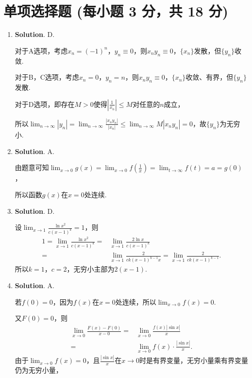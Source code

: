 \documentclass[../main.tex]{subfiles}
\begin{document}
\section{单项选择题 (每小题 3 分，共 18 分)}
\begin{enumerate}
    \item \textbf{Solution}. D.

          对于A选项，考虑$x_{n}=(-1)^{n}$，$y_{n}\equiv0$，则$x_{n}y_{n}\equiv0$，$\{x_{n}\}$发散，但$\{y_{n}\}$收敛.

          对于B，C选项，考虑$x_{n}= 0$，$y_{n}=n$，则$x_{n}y_{n}\equiv 0$，$\{x_{n}\}$收敛、有界，但$\{
              y_{n}\}$发散.

          对于D选项，即存在$M>0$使得$\left|\frac{1}{x_{n}}\right|\leq M$对任意的$n$成立，

          所以$\lim_{n\to\infty}|y_{n}| = \lim_{n\to\infty}\frac{|x_{n} y_{n}|}{|x_{n}|}
              \leq \lim_{n\to\infty}M|x_{n} y_{n}| = 0$，故$\{y_{n}\}$为无穷小.

    \item \textbf{Solution}. A.

          由题意可知$\lim_{x\to 0}g(x)=\lim_{x\to0}f\left(\frac{1}{x}\right)=\lim_{t\to\infty}
              f(t)=a=g(0)$，

          所以函数$g(x)$在$x=0$处连续.

    \item \textbf{Solution}. D.

          设$\lim_{x\to1}\frac{\ln x^{2}}{c(x-1)^{k}}=1$，则
          \[
              \begin{aligned}
                  1 = \lim_{x\to1}\frac{\ln x^2}{c(x-1)^k}= {} & \lim_{x\to1}\frac{2\ln x}{c(x-1)^k}                                             \\
                  = {}                                         & \lim_{x\to1}\frac{2}{c k (x-1)^{k-1} x}= \lim_{x\to1}\frac{2}{c k (x-1)^{k-1}}.
              \end{aligned}
          \]
          所以$k=1$，$c=2$，无穷小主部为$2(x-1)$.

    \item \textbf{Solution}. A.

          若$f(0)=0$，因为$f(x)$在$x=0$处连续，所以$\lim_{x\to0}f(x)=0$.

          又$F(0)=0$，则
          \[
              \begin{aligned}
                  \lim_{x\to0}\frac{F(x)-F(0)}{x-0}= {} & \lim_{x\to0}\frac{f(x)|\sin x|}{x}       \\
                  = {}                                  & \lim_{x\to0}f(x)\cdot\frac{|\sin x|}{x}.
              \end{aligned}
          \]
          由于$\lim_{x\to0}f(x)=0$，且$\frac{|\sin x|}{x}$在$x\to0$时是有界变量，无穷小量乘有界变量仍为无穷小量，


\end{enumerate}
\end{document}
